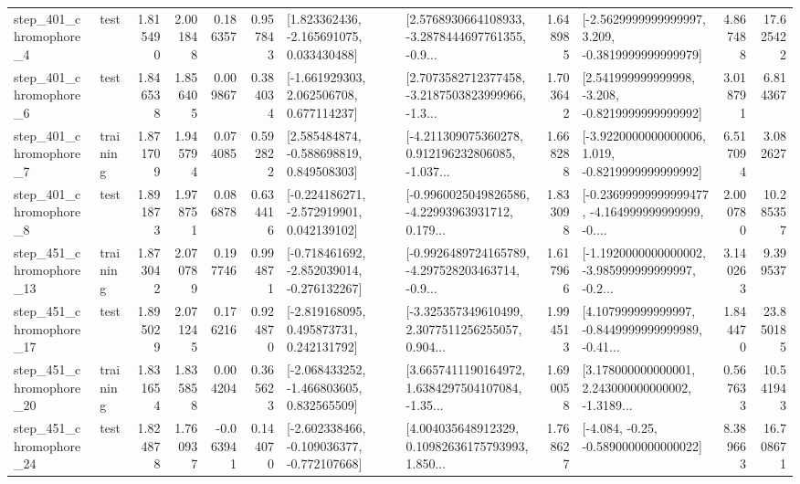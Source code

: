 \begin{tabular}{llrrrrllrlrr}
   step\_401\_chromophore\_4 &      test &      1.815490 &    2.001848 &      0.186357 &  0.957843 &    [1.823362436, -2.165691075, 0.033430488] &  [2.5768930664108933, -3.2878444697761355, -0.9... &       1.648985 &  [-2.5629999999999997, 3.209, -0.3819999999999979] &            4.867488 &         17.625422 \\
   step\_401\_chromophore\_6 &      test &      1.846538 &    1.856405 &      0.009867 &  0.384034 &    [-1.661929303, 2.062506708, 0.677114237] &  [2.7073582712377458, -3.2187503823999966, -1.3... &       1.703642 &   [2.541999999999998, -3.208, -0.8219999999999992] &            3.018791 &          6.814367 \\
   step\_401\_chromophore\_7 &  training &      1.871709 &    1.945794 &      0.074085 &  0.592822 &    [2.585484874, -0.588698819, 0.849508303] &  [-4.211309075360278, 0.912196232806085, -1.037... &       1.668288 &  [-3.9220000000000006, 1.019, -0.8219999999999992] &            6.517094 &          3.082627 \\
   step\_401\_chromophore\_8 &      test &      1.891873 &    1.978751 &      0.086878 &  0.634416 &   [-0.224186271, -2.572919901, 0.042139102] &  [-0.9960025049826586, -4.22993963931712, 0.179... &       1.833098 &  [-0.23699999999999477, -4.164999999999999, -0.... &            2.000780 &         10.285357 \\
  step\_451\_chromophore\_13 &  training &      1.873042 &    2.070789 &      0.197746 &  0.994871 &  [-0.718461692, -2.852039014, -0.276132267] &  [-0.9926489724165789, -4.297528203463714, -0.9... &       1.617966 &  [-1.1920000000000002, -3.985999999999997, -0.2... &            3.140263 &          9.399537 \\
  step\_451\_chromophore\_17 &      test &      1.895029 &    2.071245 &      0.176216 &  0.924870 &    [-2.819168095, 0.495873731, 0.242131792] &  [-3.325357349610499, 2.3077511256255057, 0.904... &       1.994513 &  [4.107999999999997, -0.8449999999999989, -0.41... &            1.844470 &         23.850185 \\
  step\_451\_chromophore\_20 &  training &      1.831654 &    1.835858 &      0.004204 &  0.365623 &   [-2.068433252, -1.466803605, 0.832565509] &  [3.6657411190164972, 1.6384297504107084, -1.35... &       1.690058 &  [3.178000000000001, 2.243000000000002, -1.3189... &            0.567633 &         10.541943 \\
  step\_451\_chromophore\_24 &      test &      1.824878 &    1.760937 &     -0.063941 &  0.144070 &  [-2.602338466, -0.109036377, -0.772107668] &  [4.004035648912329, 0.10982636175793993, 1.850... &       1.768627 &               [-4.084, -0.25, -0.5890000000000022] &            8.389663 &         16.708671 \\

\end{tabular}

